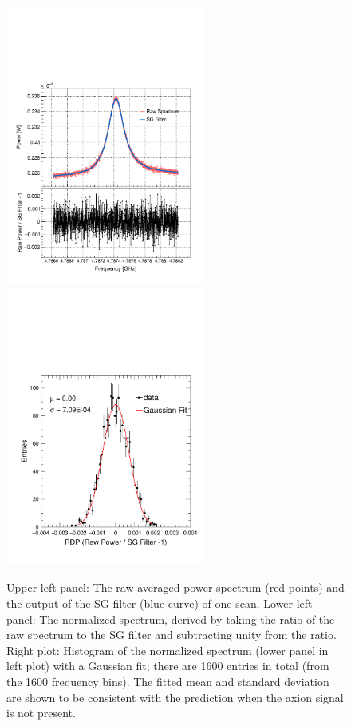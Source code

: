 \begin{figure} [htbp]
  \centering
  \includegraphics[width=6.5cm]{figures/RawPower_SGPower_Ratio_vs_Freq_Step_0100.pdf}
  \includegraphics[width=6.5cm]{figures/Histogram_RawPower_SGPower_Ratio_Step_0100.pdf}
  \caption{Upper left panel: The raw averaged power spectrum (red points) and the 
output of the SG filter (blue curve) of one scan. Lower left panel: The normalized 
spectrum,  derived by taking the ratio of the raw spectrum to the SG filter 
and subtracting unity from the ratio.
Right plot: Histogram of the normalized spectrum (lower panel in left plot) with a Gaussian 
fit; there are 1600 entries in total (from the 1600 frequency bins). 
The fitted mean and standard deviation are shown to be consistent with the prediction 
when the axion signal is not present.}
  \label{fig:raw_sg_power}
\end{figure}

